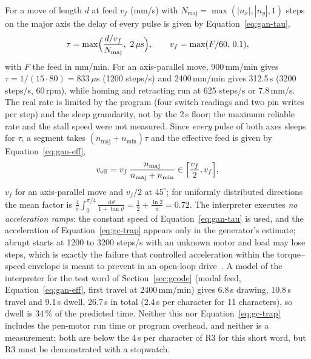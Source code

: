For a move of length $d$ at feed $v_f$ (mm/s) with $N_{\mathrm{maj}}=\max(|n_x|,|n_y|,1)$ steps on the major axis the delay of every pulse is given by Equation~\ref{eq:gan-tau},
\begin{equation}
\tau=\max\Bigl(\frac{d/v_f}{N_{\mathrm{maj}}},\ 2\,\mu\mathrm s\Bigr),\qquad v_f=\max(F/60,\,0.1),
\label{eq:gan-tau}
\end{equation}
with $F$ the feed in mm/min.
For an axis-parallel move, 900\,mm/min gives $\tau=1/(15\cdot80)=833\ \mu$s (1200 steps/s) and 2400\,mm/min gives 312.5\,\textmu s (3200 steps/s, 60\,rpm), while homing and retracting run at 625 steps/s or $7.8$\,mm/s. The real rate is limited by the program (four switch readings and two pin writes per step) and the sleep granularity, not by the 2\,\textmu s floor; the maximum reliable rate and the stall speed were not measured.
Since \emph{every} pulse of both axes sleeps for $\tau$, a segment takes $(n_{\mathrm{maj}}+n_{\mathrm{min}})\tau$ and the effective feed is given by Equation~\ref{eq:gan-eff},
\begin{equation}
v_{\mathrm{eff}}=v_f\,\frac{n_{\mathrm{maj}}}{n_{\mathrm{maj}}+n_{\mathrm{min}}}\in\Bigl[\frac{v_f}{2},v_f\Bigr],
\label{eq:gan-eff}
\end{equation}
$v_f$ for an axis-parallel move and $v_f/2$ at $45^\circ$; for uniformly distributed directions the mean factor is $\frac4\pi\int_0^{\pi/4}\frac{\mathrm d\vartheta}{1+\tan\vartheta}=\frac12+\frac{\ln2}{\pi}=0.72$.
The interpreter executes \emph{no acceleration ramps}: the constant speed of Equation~\ref{eq:gan-tau} is used, and the acceleration of Equation~\ref{eq:gc-trap} appears only in the generator's estimate; abrupt starts at 1200 to 3200 steps/s with an unknown motor and load may lose steps, which is exactly the failure that controlled acceleration within the torque--speed envelope is meant to prevent in an open-loop drive~\cite{acarnley2002}.
\label{sec:gan-timing}
A model of the interpreter for the test word of Section~\ref{sec:gcode} (modal feed, Equation~\ref{eq:gan-eff}, first travel at 2400\,mm/min) gives 6.8\,s drawing, 10.8\,s travel and 9.1\,s dwell, 26.7\,s in total (2.4\,s per character for 11 characters), so dwell is 34\,\% of the predicted time.
Neither this nor Equation~\ref{eq:gc-trap} includes the pen-motor run time or program overhead, and neither is a measurement; both are below the 4\,s per character of R3 for this short word, but R3 must be demonstrated with a stopwatch.

